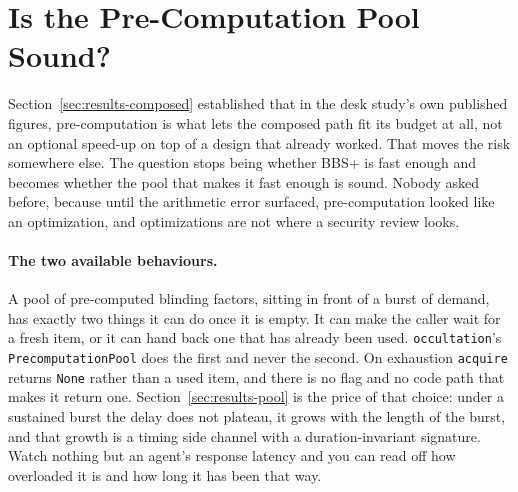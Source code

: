 \documentclass[11pt]{article}
\newcommand{\occultation}{\texttt{occultation}}
\begin{document}
\section{Is the Pre-Computation Pool Sound?}
\label{sec:pool}

Section~\ref{sec:results-composed} established that in the desk study's own
published figures, pre-computation is what lets the composed path fit its
budget at all, not an optional speed-up on top of a design that already
worked. That moves the risk somewhere else. The question stops being whether
BBS+ is fast enough and becomes whether the pool that makes it fast enough is
sound. Nobody asked before, because until the arithmetic error surfaced,
pre-computation looked like an optimization, and optimizations are not where
a security review looks.

\paragraph{The two available behaviours.} A pool of pre-computed blinding
factors, sitting in front of a burst of demand, has exactly two things it can
do once it is empty. It can make the caller wait for a fresh item, or it can
hand back one that has already been used. \occultation{}'s
\texttt{PrecomputationPool} does the first and never the second. On
exhaustion \texttt{acquire} returns \texttt{None} rather than a used item,
and there is no flag and no code path that makes it return one.
Section~\ref{sec:results-pool} is the price of that choice: under a sustained
burst the delay does not plateau, it grows with the length of the burst, and
that growth is a timing side channel with a duration-invariant signature.
Watch nothing but an agent's response latency and you can read off how
overloaded it is and how long it has been that way.
\end{document}
